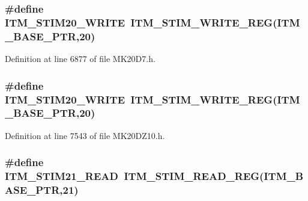 \subsubsection[{\texorpdfstring{I\+T\+M\+\_\+\+S\+T\+I\+M20\+\_\+\+W\+R\+I\+TE}{ITM_STIM20_WRITE}}]{\setlength{\rightskip}{0pt plus 5cm}\#define I\+T\+M\+\_\+\+S\+T\+I\+M20\+\_\+\+W\+R\+I\+TE~{\bf I\+T\+M\+\_\+\+S\+T\+I\+M\+\_\+\+W\+R\+I\+T\+E\+\_\+\+R\+EG}({\bf I\+T\+M\+\_\+\+B\+A\+S\+E\+\_\+\+P\+TR},20)}\hypertarget{group___i_t_m___register___accessor___macros_ga1e109dc4eb08a82ad21ba29f64b02976}{}\label{group___i_t_m___register___accessor___macros_ga1e109dc4eb08a82ad21ba29f64b02976}


Definition at line 6877 of file M\+K20\+D7.\+h.

\subsubsection[{\texorpdfstring{I\+T\+M\+\_\+\+S\+T\+I\+M20\+\_\+\+W\+R\+I\+TE}{ITM_STIM20_WRITE}}]{\setlength{\rightskip}{0pt plus 5cm}\#define I\+T\+M\+\_\+\+S\+T\+I\+M20\+\_\+\+W\+R\+I\+TE~{\bf I\+T\+M\+\_\+\+S\+T\+I\+M\+\_\+\+W\+R\+I\+T\+E\+\_\+\+R\+EG}({\bf I\+T\+M\+\_\+\+B\+A\+S\+E\+\_\+\+P\+TR},20)}\hypertarget{group___i_t_m___register___accessor___macros_ga1e109dc4eb08a82ad21ba29f64b02976}{}\label{group___i_t_m___register___accessor___macros_ga1e109dc4eb08a82ad21ba29f64b02976}


Definition at line 7543 of file M\+K20\+D\+Z10.\+h.

\subsubsection[{\texorpdfstring{I\+T\+M\+\_\+\+S\+T\+I\+M21\+\_\+\+R\+E\+AD}{ITM_STIM21_READ}}]{\setlength{\rightskip}{0pt plus 5cm}\#define I\+T\+M\+\_\+\+S\+T\+I\+M21\+\_\+\+R\+E\+AD~{\bf I\+T\+M\+\_\+\+S\+T\+I\+M\+\_\+\+R\+E\+A\+D\+\_\+\+R\+EG}({\bf I\+T\+M\+\_\+\+B\+A\+S\+E\+\_\+\+P\+TR},21)}\hypertarget{group___i_t_m___register___accessor___macros_ga5e2870c6c2d38a75f0477a1030fc60aa}{}\label{group___i_t_m___register___accessor___macros_ga5e2870c6c2d38a75f0477a1030fc60aa}



